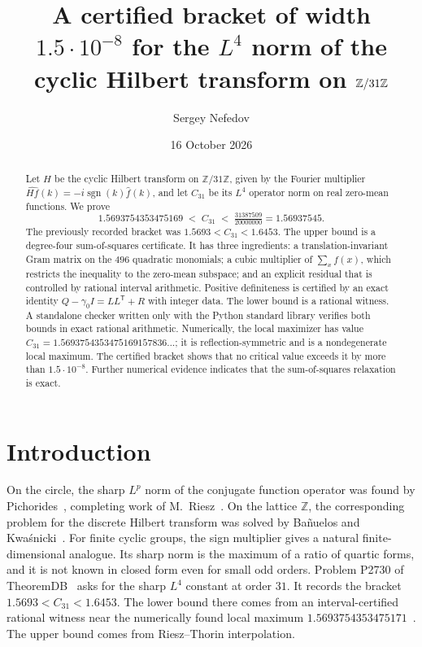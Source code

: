 \documentclass[11pt]{amsart}
\title[The $L^4$ norm of the cyclic Hilbert transform on $\Z/31\Z$]{A certified bracket of width $1.5\cdot 10^{-8}$ for the $L^4$ norm of the cyclic Hilbert transform on $\Z/31\Z$}
\author{Sergey Nefedov}
\date{16 October 2026}
\theoremstyle{definition}
\theoremstyle{remark}
\newcommand{\Z}{\mathbb{Z}}
\newcommand{\ZN}{\Z/31\Z}
\DeclareMathOperator{\sgn}{sgn}
\begin{document}
\begin{abstract}
Let $H$ be the cyclic Hilbert transform on $\ZN$, given by the Fourier multiplier $\widehat{Hf}(k)=-i\sgn(k)\widehat f(k)$, and let $C_{31}$ be its $L^4$ operator norm on real zero-mean functions. We prove
\[
  1.5693754353475169 \;<\; C_{31} \;<\; \tfrac{31387509}{20000000} = 1.56937545 .
\]
The previously recorded bracket was $1.5693<C_{31}<1.6453$. The upper bound is a degree-four sum-of-squares certificate. It has three ingredients: a translation-invariant Gram matrix on the $496$ quadratic monomials; a cubic multiplier of $\sum_x f(x)$, which restricts the inequality to the zero-mean subspace; and an explicit residual that is controlled by rational interval arithmetic. Positive definiteness is certified by an exact identity $Q-\gamma_0 I=LL^{\mathsf T}+R$ with integer data. The lower bound is a rational witness. A standalone checker written only with the Python standard library verifies both bounds in exact rational arithmetic. Numerically, the local maximizer has value $C_{31}=1.5693754353475169157836\dots$; it is reflection-symmetric and is a nondegenerate local maximum. The certified bracket shows that no critical value exceeds it by more than $1.5\cdot10^{-8}$. Further numerical evidence indicates that the sum-of-squares relaxation is exact.
\end{abstract}

\maketitle

\section{Introduction}

On the circle, the sharp $L^p$ norm of the conjugate function operator was found by Pichorides~\cite{Pichorides1972}, completing work of M.~Riesz~\cite{Riesz1928}. On the lattice $\Z$, the corresponding problem for the discrete Hilbert transform was solved by Ba\~nuelos and Kwa\'snicki~\cite{BanuelosKwasnicki2019}. For finite cyclic groups, the sign multiplier gives a natural finite-dimensional analogue. Its sharp norm is the maximum of a ratio of quartic forms, and it is not known in closed form even for small odd orders. Problem P2730 of TheoremDB~\cite{tdbP2730} asks for the sharp $L^4$ constant at order $31$. It records the bracket $1.5693<C_{31}<1.6453$. The lower bound there comes from an interval-certified rational witness near the numerically found local maximum $1.5693754353475171$~\cite{tdbR144}. The upper bound comes from Riesz--Thorin interpolation.
\end{document}

